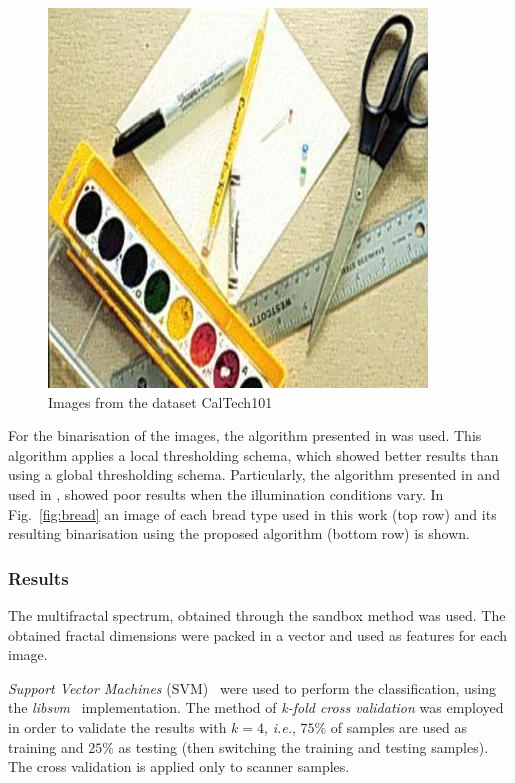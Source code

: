 \documentclass[oneside,a4paper,english,links,12pt]{article}
\begin{document}
\begin{figure}[htb]
\includegraphics[scale=0.20]{imagenes/image_0048}
\caption{Images from the dataset CalTech101}
\label{fig:nonbread}
\end{figure}

For the binarisation of the images, the algorithm presented in \cite{White83} was used. This algorithm applies a local thresholding schema, which showed better results than using a global thresholding schema. Particularly, the algorithm presented in \cite{Huang95} and used in \cite{Gonzales2008}, showed poor results when the illumination conditions vary. In Fig.~\ref{fig:bread} an image of each bread type used in this work (top row) and its resulting binarisation using the proposed algorithm (bottom row) is shown.  

\subsubsection{Results}
The multifractal spectrum, obtained through the sandbox method was used. The obtained fractal dimensions were packed in a vector and used as features for each image.

{\em Support Vector Machines} (SVM)~\cite{Boser92} were used to perform the classification, using the {\em libsvm}~\cite{Chang2011} implementation. The method of {\em k-fold cross validation} was employed in order to validate the results with $k = 4$, {\em i.e.}, $75\%$ of samples are used as training and $25\%$ as testing (then switching the training and testing samples). The cross validation is applied only to scanner samples.
\end{document}
